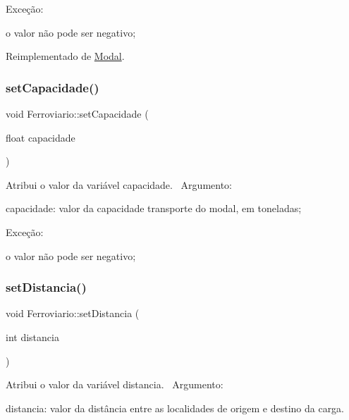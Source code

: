 Exceção\+:
\begin{DoxyItemize}
\item o valor não pode ser negativo;
\end{DoxyItemize}

Reimplementado de \hyperlink{classModal_a20cee7247cce33806d681e1d60347cc5}{Modal}.

\mbox{\label{classFerroviario_aa40975457d7179ba75d5436251ca66e0}} 
\subsubsection{\texorpdfstring{set\+Capacidade()}{setCapacidade()}}
{\footnotesize\ttfamily void Ferroviario\+::set\+Capacidade (\begin{DoxyParamCaption}\item[{float}]{capacidade }\end{DoxyParamCaption})}

Atribui o valor da variável capacidade.~\newline
 Argumento\+:
\begin{DoxyItemize}
\item capacidade\+: valor da capacidade transporte do modal, em toneladas;
\end{DoxyItemize}

Exceção\+:
\begin{DoxyItemize}
\item o valor não pode ser negativo;
\end{DoxyItemize}\mbox{\label{classFerroviario_a3015ee3389051f06e8bccbd70832ca4a}} 
\subsubsection{\texorpdfstring{set\+Distancia()}{setDistancia()}}
{\footnotesize\ttfamily void Ferroviario\+::set\+Distancia (\begin{DoxyParamCaption}\item[{int}]{distancia }\end{DoxyParamCaption})}

Atribui o valor da variável distancia.~\newline
 Argumento\+:
\begin{DoxyItemize}
\item distancia\+: valor da distância entre as localidades de origem e destino da carga.
\end{DoxyItemize}

